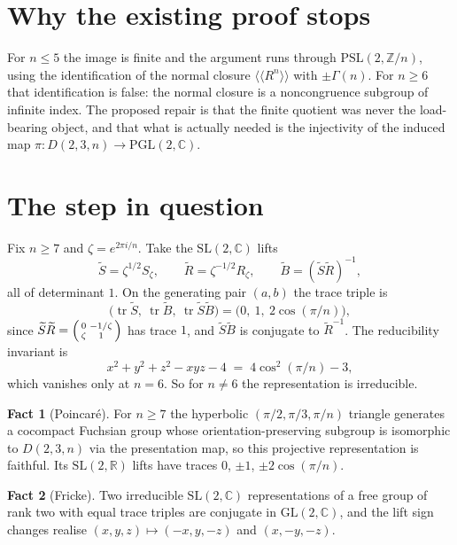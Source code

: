 \documentclass[11pt]{amsart}
\theoremstyle{definition}
\newtheorem{fact}{Fact}
\newcommand{\PSL}{\mathrm{PSL}}
\newcommand{\PGL}{\mathrm{PGL}}
\newcommand{\SL}{\mathrm{SL}}
\newcommand{\GL}{\mathrm{GL}}
\newcommand{\R}{\mathbb{R}}
\newcommand{\Z}{\mathbb{Z}}
\newcommand{\C}{\mathbb{C}}
\begin{document}
\section*{Why the existing proof stops}

For $n\le 5$ the image is finite and the argument runs through $\PSL(2,\Z/n)$,
using the identification of the normal closure $\langle\langle R^{n}\rangle\rangle$
with $\pm\Gamma(n)$. For $n\ge 6$ that identification is false: the normal
closure is a noncongruence subgroup of infinite index. The proposed repair is
that the finite quotient was never the load-bearing object, and that what is
actually needed is the injectivity of the induced map
$\pi: D(2,3,n)\to\PGL(2,\C)$.

\section*{The step in question}

Fix $n\ge 7$ and $\zeta=e^{2\pi i/n}$. Take the $\SL(2,\C)$ lifts
\[
  \widetilde S=\zeta^{1/2}S_\zeta,\qquad
  \widetilde R=\zeta^{-1/2}R_\zeta,\qquad
  \widetilde B=(\widetilde S\widetilde R)^{-1},
\]
all of determinant $1$. On the generating pair $(a,b)$ the trace triple is
\[
  \bigl(\operatorname{tr}\widetilde S,\ \operatorname{tr}\widetilde B,\
   \operatorname{tr}\widetilde S\widetilde B\bigr)
  =\bigl(0,\ 1,\ 2\cos(\pi/n)\bigr),
\]
since $\widetilde S\widetilde R=\begin{psmallmatrix}0&-1/\zeta\\ \zeta&1\end{psmallmatrix}$
has trace $1$, and $\widetilde S\widetilde B$ is conjugate to $\widetilde R^{-1}$.
The reducibility invariant is
\[
  x^{2}+y^{2}+z^{2}-xyz-4 \;=\; 4\cos^{2}(\pi/n)-3 ,
\]
which vanishes only at $n=6$. So for $n\ne 6$ the representation is irreducible.

\begin{fact}[Poincar\'e]
For $n\ge 7$ the hyperbolic $(\pi/2,\pi/3,\pi/n)$ triangle generates a
cocompact Fuchsian group whose orientation-preserving subgroup is isomorphic to
$D(2,3,n)$ via the presentation map, so this projective representation is
faithful. Its $\SL(2,\R)$ lifts have traces $0$, $\pm 1$, $\pm 2\cos(\pi/n)$.
\end{fact}

\begin{fact}[Fricke]
Two irreducible $\SL(2,\C)$ representations of a free group of rank two with
equal trace triples are conjugate in $\GL(2,\C)$, and the lift sign changes
realise $(x,y,z)\mapsto(-x,y,-z)$ and $(x,-y,-z)$.
\end{fact}
\end{document}
